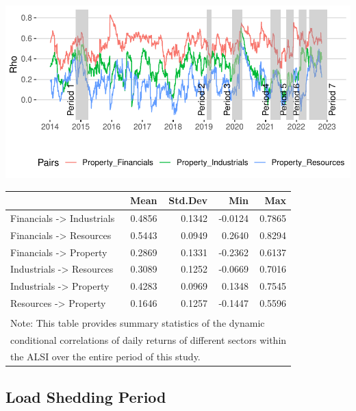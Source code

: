 \documentclass[11pt,preprint, authoryear]{elsarticle}
\let\origfigure\figure
\let\endorigfigure\endfigure
\renewenvironment{figure}[1][2] {
    \expandafter\origfigure\expandafter[H]
} {
    \endorigfigure
}
\let\origtable\table
\let\endorigtable\endtable
\renewenvironment{table}[1][2] {
    \expandafter\origtable\expandafter[H]
} {
    \endorigtable
}
\numberwithin{equation}{section}
\numberwithin{figure}{section}
\numberwithin{table}{section}
\begin{document}
\begin{figure}[H]

{\centering \includegraphics{Paper_files/figure-latex/DCCfullp-1} 

}

\caption{Dynamic Conditional Correlations: Property \label{DCCfullp}}\label{fig:DCCfullp}
\end{figure}

\begin{table}
\centering\begingroup\fontsize{9}{11}\selectfont

\begin{tabular}{l|r|r|r|r}
\hline
  & Mean & Std.Dev & Min & Max\\
\hline
Financials -> Industrials & 0.4856 & 0.1342 & -0.0124 & 0.7865\\
\hline
Financials -> Resources & 0.5443 & 0.0949 & 0.2640 & 0.8294\\
\hline
Financials -> Property & 0.2869 & 0.1331 & -0.2362 & 0.6137\\
\hline
Industrials -> Resources & 0.3089 & 0.1252 & -0.0669 & 0.7016\\
\hline
Industrials -> Property & 0.4283 & 0.0969 & 0.1348 & 0.7545\\
\hline
Resources -> Property & 0.1646 & 0.1257 & -0.1447 & 0.5596\\
\hline
\multicolumn{5}{l}{\textsuperscript{} Note: This table provides summary statistics of the dynamic}\\
\multicolumn{5}{l}{conditional correlations of daily returns of different sectors within}\\
\multicolumn{5}{l}{the ALSI over the entire period of this study.}\\
\end{tabular}
\endgroup{}
\end{table}

\hypertarget{load-shedding-period}{%
\subsection{Load Shedding Period}\label{load-shedding-period}}
\end{document}
